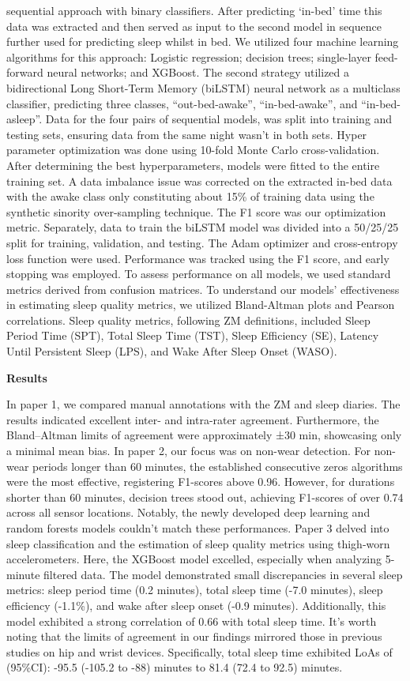 \documentclass[
  9pt,
]{scrbook}
\begin{document}
sequential approach with binary classifiers. After predicting `in-bed'
time this data was extracted and then served as input to the second
model in sequence further used for predicting sleep whilst in bed. We
utilized four machine learning algorithms for this approach: Logistic
regression; decision trees; single-layer feed-forward neural networks;
and XGBoost. The second strategy utilized a bidirectional Long
Short-Term Memory (biLSTM) neural network as a multiclass classifier,
predicting three classes, ``out-bed-awake'', ``in-bed-awake'', and
``in-bed-asleep''. Data for the four pairs of sequential models, was
split into training and testing sets, ensuring data from the same night
wasn't in both sets. Hyper parameter optimization was done using 10-fold
Monte Carlo cross-validation. After determining the best
hyperparameters, models were fitted to the entire training set. A data
imbalance issue was corrected on the extracted in-bed data with the
awake class only constituting about 15\% of training data using the
synthetic sinority over-sampling technique. The F1 score was our
optimization metric. Separately, data to train the biLSTM model was
divided into a 50/25/25 split for training, validation, and testing. The
Adam optimizer and cross-entropy loss function were used. Performance
was tracked using the F1 score, and early stopping was employed. To
assess performance on all models, we used standard metrics derived from
confusion matrices. To understand our models' effectiveness in
estimating sleep quality metrics, we utilized Bland-Altman plots and
Pearson correlations. Sleep quality metrics, following ZM definitions,
included Sleep Period Time (SPT), Total Sleep Time (TST), Sleep
Efficiency (SE), Latency Until Persistent Sleep (LPS), and Wake After
Sleep Onset (WASO).

\textbf{Results}

In paper 1, we compared manual annotations with the ZM and sleep
diaries. The results indicated excellent inter- and intra-rater
agreement. Furthermore, the Bland--Altman limits of agreement were
approximately ±30 min, showcasing only a minimal mean bias. In paper 2,
our focus was on non-wear detection. For non-wear periods longer than 60
minutes, the established consecutive zeros algorithms were the most
effective, registering F1-scores above 0.96. However, for durations
shorter than 60 minutes, decision trees stood out, achieving F1-scores
of over 0.74 across all sensor locations. Notably, the newly developed
deep learning and random forests models couldn't match these
performances. Paper 3 delved into sleep classification and the
estimation of sleep quality metrics using thigh-worn accelerometers.
Here, the XGBoost model excelled, especially when analyzing 5-minute
filtered data. The model demonstrated small discrepancies in several
sleep metrics: sleep period time (0.2 minutes), total sleep time (-7.0
minutes), sleep efficiency (-1.1\%), and wake after sleep onset (-0.9
minutes). Additionally, this model exhibited a strong correlation of
0.66 with total sleep time. It's worth noting that the limits of
agreement in our findings mirrored those in previous studies on hip and
wrist devices. Specifically, total sleep time exhibited LoAs of
(95\%CI): -95.5 (-105.2 to -88) minutes to 81.4 (72.4 to 92.5) minutes.
\end{document}
